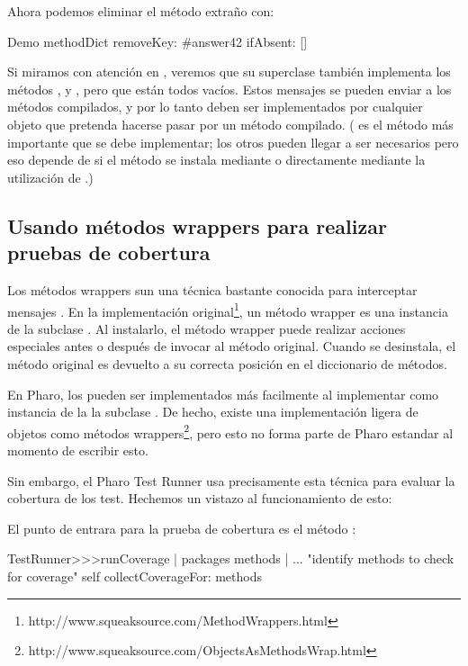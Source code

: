\documentclass[a4paper,10pt,twoside]{book}
\begin{document}
Ahora podemos eliminar el método extraño con:
\begin{code}{}
Demo methodDict removeKey: #answer42 ifAbsent: []
\end{code}

Si miramos con atención en , veremos que
su superclase también implementa los métodos ,
 y , pero que están todos vacíos.
Estos mensajes se pueden enviar a los métodos compilados, y por lo
tanto deben ser implementados por cualquier objeto que pretenda
hacerse pasar por un método compilado.  ( es el método
más importante que se debe implementar; los otros pueden llegar a ser
necesarios pero eso depende de si el método se instala mediante
 o directamente mediante
la utilización de .)


\subsection{Usando m\'etodos wrappers para realizar pruebas de cobertura}

Los m\'etodos wrappers sun una t\'ecnica bastante conocida para interceptar mensajes \cite{Bran98a}. En la implementaci\'on original\footnote{http://www.squeaksource.com/MethodWrappers.html}, un m\'etodo wrapper es una instancia de la subclase . Al instalarlo, el m\'etodo wrapper puede realizar acciones especiales antes o despu\'es de invocar al m\'etodo original. Cuando se desinstala, el m\'etodo original es devuelto a su correcta posici\'on en el diccionario de m\'etodos.

En Pharo, los  pueden ser implementados m\'as facilmente al implementar  como instancia de la la subclase . De hecho, existe una implementaci\'on ligera de objetos como m\'etodos wrappers\footnote{http://www.squeaksource.com/ObjectsAsMethodsWrap.html}, pero esto no forma parte de Pharo estandar al momento de escribir esto.

Sin embargo, el Pharo Test Runner usa precisamente esta técnica para evaluar la cobertura de los test. Hechemos un vistazo al funcionamiento de esto:

El punto de entrara para la prueba de cobertura es el m\'etodo :
\begin{code}{}
TestRunner>>>runCoverage
        | packages methods |
        ... "identify methods to check for coverage"
        self collectCoverageFor: methods
\end{code}
\end{document}
